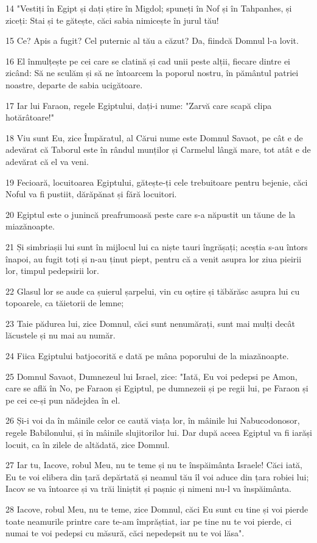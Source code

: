 \par 14 "Vestiți în Egipt și dați știre în Migdol; spuneți în Nof și în Tahpanhes, și ziceți: Stai și te gătește, căci sabia nimicește în jurul tău!
\par 15 Ce? Apis a fugit? Cel puternic al tău a căzut? Da, fiindcă Domnul l-a lovit.
\par 16 El înmulțește pe cei care se clatină și cad unii peste alții, fiecare dintre ei zicând: Să ne sculăm și să ne întoarcem la poporul nostru, în pământul patriei noastre, departe de sabia ucigătoare.
\par 17 Iar lui Faraon, regele Egiptului, dați-i nume: "Zarvă care scapă clipa hotărâtoare!"
\par 18 Viu sunt Eu, zice Împăratul, al Cărui nume este Domnul Savaot, pe cât e de adevărat că Taborul este în rândul munților și Carmelul lângă mare, tot atât e de adevărat că el va veni.
\par 19 Fecioară, locuitoarea Egiptului, gătește-ți cele trebuitoare pentru bejenie, căci Noful va fi pustiit, dărăpănat și fără locuitori.
\par 20 Egiptul este o junincă preafrumoasă peste care s-a năpustit un tăune de la miazănoapte.
\par 21 Și simbriașii lui sunt în mijlocul lui ca niște tauri îngrășați; aceștia s-au întors înapoi, au fugit toți și n-au ținut piept, pentru că a venit asupra lor ziua pieirii lor, timpul pedepsirii lor.
\par 22 Glasul lor se aude ca șuierul șarpelui, vin cu oștire și tăbărăsc asupra lui cu topoarele, ca tăietorii de lemne;
\par 23 Taie pădurea lui, zice Domnul, căci sunt nenumărați, sunt mai mulți decât lăcustele și nu mai au număr.
\par 24 Fiica Egiptului batjocorită e dată pe mâna poporului de la miazănoapte.
\par 25 Domnul Savaot, Dumnezeul lui Israel, zice: "Iată, Eu voi pedepsi pe Amon, care se află în No, pe Faraon și Egiptul, pe dumnezeii și pe regii lui, pe Faraon și pe cei ce-și pun nădejdea în el.
\par 26 Și-i voi da în mâinile celor ce caută viața lor, în mâinile lui Nabucodonosor, regele Babilonului, și în mâinile slujitorilor lui. Dar după aceea Egiptul va fi iarăși locuit, ca în zilele de altădată, zice Domnul.
\par 27 Iar tu, Iacove, robul Meu, nu te teme și nu te înspăimânta Israele! Căci iată, Eu te voi elibera din țară depărtată și neamul tău îl voi aduce din țara robiei lui; Iacov se va întoarce și va trăi liniștit și pașnic și nimeni nu-l va înspăimânta.
\par 28 Iacove, robul Meu, nu te teme, zice Domnul, căci Eu sunt cu tine și voi pierde toate neamurile printre care te-am împrăștiat, iar pe tine nu te voi pierde, ci numai te voi pedepsi cu măsură, căci nepedepsit nu te voi lăsa".

